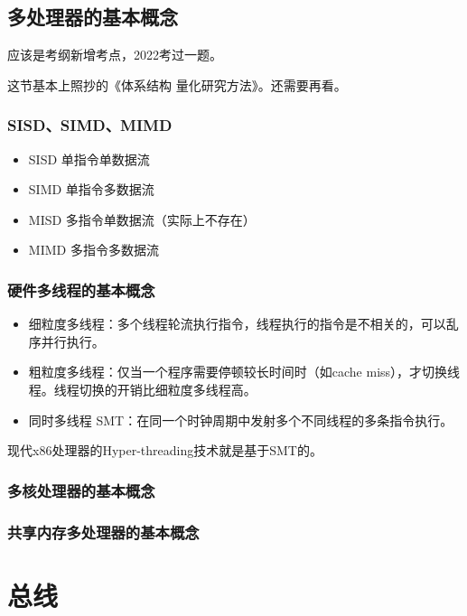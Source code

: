 \documentclass[12pt, a4paper, oneside]{ctexart}
\begin{document}
\subsection{多处理器的基本概念}

应该是考纲新增考点，2022考过一题。

这节基本上照抄的《体系结构 量化研究方法》。还需要再看。

\subsubsection{SISD、SIMD、MIMD}

\begin{itemize}
  \item SISD 单指令单数据流
  \item SIMD 单指令多数据流
  \item MISD 多指令单数据流（实际上不存在）
  \item MIMD 多指令多数据流
\end{itemize}

\subsubsection{硬件多线程的基本概念}

\begin{itemize}
  \item 细粒度多线程：多个线程轮流执行指令，线程执行的指令是不相关的，可以乱序并行执行。
  \item 粗粒度多线程：仅当一个程序需要停顿较长时间时（如cache miss），才切换线程。线程切换的开销比细粒度多线程高。
  \item 同时多线程 SMT：在同一个时钟周期中发射多个不同线程的多条指令执行。
\end{itemize}

现代x86处理器的Hyper-threading技术就是基于SMT的。

\subsubsection{多核处理器的基本概念}

\subsubsection{共享内存多处理器的基本概念}

\section{总线}
\end{document}

